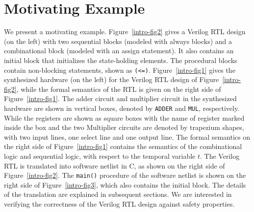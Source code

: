 \section{Motivating Example} 
%
We present a motivating example. 
%  
Figure~\ref{intro-fig2} gives a Verilog RTL design (on the left) with 
two sequential blocks (modeled with always blocks) and a combinational block 
(modeled with an assign statement). It also contains an initial block that 
initializes the state-holding elements. The procedural blocks contain 
non-blocking statements, shown as \texttt{(<=)}.  Figure~\ref{intro-fig1} 
gives the synthesized hardware (on the left) for the Verilog RTL design 
of Figure~\ref{intro-fig2}, while the formal semantics of the RTL is given 
on the right side of Figure~\ref{intro-fig1}.  The adder circuit and 
multiplier circuit in the synthesized hardware are shown in vertical boxes, 
denoted by \texttt{ADDER} and \texttt{MUL}, respectively.  While the 
registers are shown as square boxes with the name of register marked 
inside the box and the two Multiplier circuits are denoted by trapezium 
shapes, with two input lines, one select line and one output line.  
The formal semantics on the right side of Figure~\ref{intro-fig1} 
contains the semantics of the combinational logic and sequential logic, 
with respect to the temporal variable $t$. 
%
The Verilog RTL is translated into software netlist in C, as shown on the 
right side of Figure~\ref{intro-fig2}.  The \texttt{main()} procedure of 
the software netlist is shown on the right side of Figure~\ref{intro-fig3}, 
which also contains the initial block.
%  
The details of the translation are explained in subsequent sections.  
We are interested in verifying the correctness of the Verilog RTL design 
against safety properties. 
%

